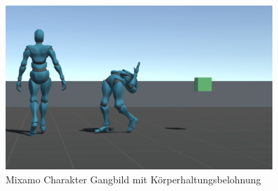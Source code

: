 \begin{figure}[H]
  \centering  
  \includegraphics[width=0.9\textwidth]{img/charakter_mixamo_imitation}
  \caption{Mixamo Charakter Gangbild mit Körperhaltungsbelohnung}
  \label{fig:charakter_mixamo_imitation}
\end{figure}